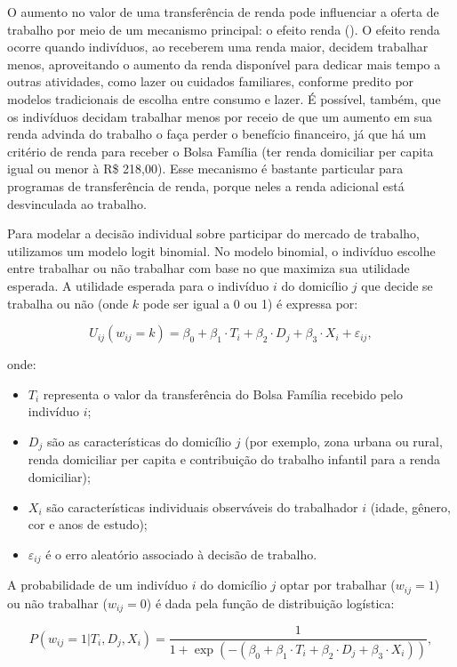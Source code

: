 \documentclass[12pt, a4paper, openany]{book}
\numberwithin{equation}{chapter}
\numberwithin{table}{chapter}
\numberwithin{figure}{chapter}
\theoremstyle{break}
\begin{document}
O aumento no valor de uma transferência de renda pode influenciar a oferta de trabalho por meio de um mecanismo principal: o efeito renda (\cite{kaufman2006economics}). O efeito renda ocorre quando indivíduos, ao receberem uma renda maior, decidem trabalhar menos, aproveitando o aumento da renda disponível para dedicar mais tempo a outras atividades, como lazer ou cuidados familiares, conforme predito por modelos tradicionais de escolha entre consumo e lazer. É possível, também, que os indivíduos decidam trabalhar menos por receio de que um aumento em sua renda advinda do trabalho o faça perder o benefício financeiro, já que há um critério de renda para receber o Bolsa Família (ter renda domiciliar per capita igual ou menor à R\$ 218,00). Esse mecanismo é bastante particular para programas de transferência de renda, porque neles a renda adicional está desvinculada ao trabalho. 

Para modelar a decisão individual sobre participar do mercado de trabalho, utilizamos um modelo logit binomial. No modelo binomial, o indivíduo escolhe entre trabalhar ou não trabalhar com base no que maximiza sua utilidade esperada. A utilidade esperada para o indivíduo \(i\) do domicílio \(j\) que decide se trabalha ou não (onde \(k\) pode ser igual a 0 ou 1) é expressa por:

\[
U_{ij}(w_{ij} = k) = \beta_0 + \beta_1 \cdot T_i + \beta_2 \cdot D_j + \beta_3 \cdot X_i + \varepsilon_{ij},
\]

onde:  
\begin{itemize}
    \item \(T_i\) representa o valor da transferência do Bolsa Família recebido pelo indivíduo \(i\);
    \item \(D_j\) são as características do domicílio \(j\) (por exemplo, zona urbana ou rural, renda domiciliar per capita e contribuição do trabalho infantil para a renda domiciliar);
    \item \(X_i\) são características individuais observáveis do trabalhador \(i\) (idade, gênero, cor e anos de estudo);
    \item \(\varepsilon_{ij}\) é o erro aleatório associado à decisão de trabalho.
\end{itemize}

A probabilidade de um indivíduo \(i\) do domicílio \(j\) optar por trabalhar (\(w_{ij} = 1\)) ou não trabalhar (\(w_{ij} = 0\)) é dada pela função de distribuição logística:

\[
P(w_{ij} = 1 | T_i, D_j, X_i) = \frac{1}{1 + \exp\left( -\left( \beta_0 + \beta_1 \cdot T_i + \beta_2 \cdot D_j + \beta_3 \cdot X_i \right) \right)},
\]
\end{document}
